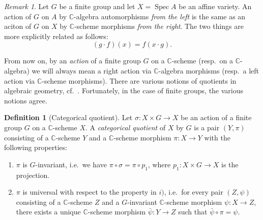 \documentclass[12pt,a4paper]{amsart}
\theoremstyle{plain}
\theoremstyle{definition}
\newtheorem{defn}[thm]{Definition}
\theoremstyle{remark}
\newtheorem{rem}[thm]{Remark}
\begin{document}
\begin{rem}
  Let $G$ be a finite group and let $X = \operatorname{Spec}{A}$ be an affine variety.
  An action of $G$ on $A$ by $\mathbb{C}$-algebra automorphisms \textit{from the left} is the same as an aciton of $G$ on $X$ by $\mathbb{C}$-scheme morphisms \textit{from the right}.
  The two things are more explicitly related as follows:
  \[ (g \cdot f)(x) = f(x \cdot g). \]
\end{rem}

From now on, by an \textit{action} of a finite group $G$ on a $\mathbb{C}$-scheme (resp.~on a $\mathbb{C}$-algebra) we will always mean a right action via $\mathbb{C}$-algebra morphisms (resp.~a left action via $\mathbb{C}$-scheme morphisms).
There are various notions of quotients in algebraic geometry, cf.~\cite[\S 0.1]{mfk94}.
Fortunately, in the case of finite groups, the various notions agree.

\begin{defn}[Categorical quotient]
  Let $\sigma \colon X \times G \to X$ be an action of a finite group $G$ on a $\mathbb{C}$-scheme $X$.
  A \textit{categorical quotient} of $X$ by $G$ is a pair $(Y,\pi)$ consisting of a $\mathbb{C}$-scheme $Y$ and a $\mathbb{C}$-scheme morphism $\pi \colon X \to Y$ with the following properties:
  \begin{enumerate}[label=\roman*)]
    \item $\pi$ is $G$-invariant, i.e.~we have $\pi \circ \sigma = \pi \circ p_{1}$, where $p_{1} \colon X \times G \to X$ is the projection.
    \item $\pi$ is universal with respect to the property in $i)$, i.e.~for every pair $(Z,\psi)$ consisting of a $\mathbb{C}$-scheme $Z$ and a $G$-invariant $\mathbb{C}$-scheme morphism $\psi \colon X \to Z$, there exists a unique $\mathbb{C}$-scheme morphism $\bar{\psi} \colon Y \to Z$ such that $\bar{\psi} \circ \pi = \psi$.
  \end{enumerate}
\end{defn}
\end{document}
